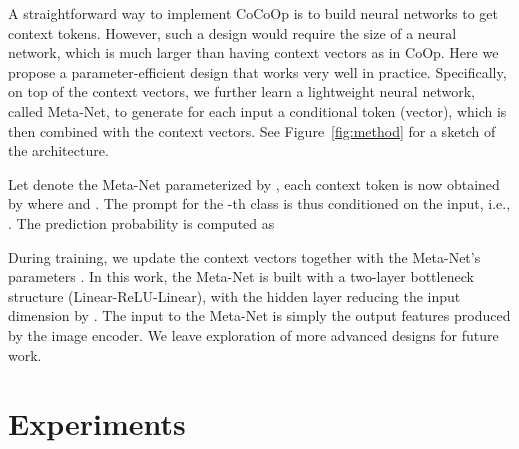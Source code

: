 \documentclass[10pt,twocolumn,letterpaper]{article}
\begin{document}
A straightforward way to implement CoCoOp is to build  neural networks to get  context tokens. However, such a design would require  the size of a neural network, which is much larger than having  context vectors as in CoOp. Here we propose a parameter-efficient design that works very well in practice. Specifically, on top of the  context vectors, we further learn a lightweight neural network, called Meta-Net, to generate for each input a conditional token (vector), which is then combined with the context vectors. See Figure~\ref{fig:method} for a sketch of the architecture.

Let  denote the Meta-Net parameterized by , each context token is now obtained by  where  and . The prompt for the -th class is thus conditioned on the input, i.e., . The prediction probability is computed as


During training, we update the context vectors  together with the Meta-Net's parameters . In this work, the Meta-Net is built with a two-layer bottleneck structure (Linear-ReLU-Linear), with the hidden layer reducing the input dimension by . The input to the Meta-Net is simply the output features produced by the image encoder. We leave exploration of more advanced designs for future work.


\section{Experiments}
\label{sec:experiments}
\end{document}
